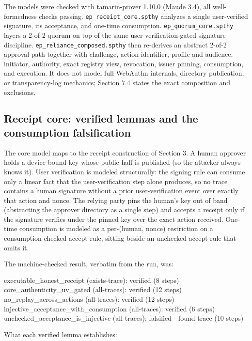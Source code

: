 \documentclass[11pt]{article}
\newcommand{\code}[1]{\texttt{#1}}
\begin{document}
The models were checked with tamarin-prover 1.10.0 (Maude 3.4), all
well-formedness checks passing. \code{ep\_receipt\_core.spthy} analyzes a single
user-verified signature, its acceptance, and one-time consumption.
\code{ep\_quorum\_core.spthy} layers a 2-of-2 quorum on top of the same
user-verification-gated signature discipline. \code{ep\_reliance\_composed.spthy}
then re-derives an abstract 2-of-2 approval path together with challenge, action
identifier, profile and audience, initiator, authority, exact registry view,
revocation, issuer pinning, consumption, and execution. It does not model full
WebAuthn internals, directory publication, or transparency-log mechanics; Section
7.4 states the exact composition and exclusions.

\subsection{Receipt core: verified lemmas and the consumption falsification}

The core model maps to the receipt construction of Section 3. A human approver
holds a device-bound key whose public half is published (so the attacker always
knows it). User verification is modeled structurally: the signing rule can consume
only a linear fact that the user-verification step alone produces, so no trace
contains a human signature without a prior user-verification event over exactly
that action and nonce. The relying party pins the human's key out of band
(abstracting the approver directory as a single step) and accepts a receipt only if
the signature verifies under the pinned key over the exact action received.
One-time consumption is modeled as a per-(human, nonce) restriction on a
consumption-checked accept rule, sitting beside an unchecked accept rule that omits
it.

The machine-checked result, verbatim from the run, was:

\begin{tool}
executable_honest_receipt (exists-trace): verified (8 steps)
core_authenticity_uv_gated (all-traces): verified (12 steps)
no_replay_across_actions (all-traces): verified (12 steps)
injective_acceptance_with_consumption (all-traces): verified (6 steps)
unchecked_acceptance_is_injective (all-traces): falsified - found trace (10 steps)
\end{tool}

What each verified lemma establishes:
\end{document}
